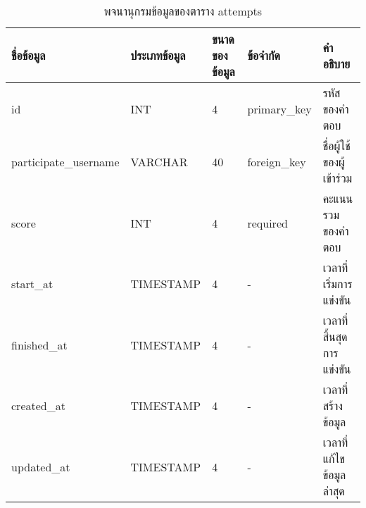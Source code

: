 \begin{table}[H]
    \caption{พจนานุกรมข้อมูลของตาราง attempts}
    \label{tab:database-attempts}
    \begin{tabularx}{\textwidth}{ | p{2.25cm} | p{2.20cm} | p{2.45cm} | p{2.05cm} | X | }
    \hline
    \textbf{ชื่อข้อมูล} & \textbf{ประเภทข้อมูล} & \textbf{ขนาดของข้อมูล} & \textbf{ข้อจำกัด} & \textbf{คำอธิบาย} \\
    \hline
    id & INT & 4 & primary\_key & รหัสของคำตอบ \\
    \hline
    participate\_username & VARCHAR & 40 & foreign\_key & ชื่อผู้ใช้ของผู้เข้าร่วม \\
    \hline
    score & INT & 4 & required & คะแนนรวมของคำตอบ \\
    \hline
    start\_at & TIMESTAMP & 4 & - & เวลาที่เริ่มการแข่งขัน \\
    \hline
    finished\_at & TIMESTAMP & 4 & - & เวลาที่สิ้นสุดการแข่งขัน \\
    \hline
    created\_at & TIMESTAMP & 4 & - & เวลาที่สร้างข้อมูล \\
    \hline
    updated\_at & TIMESTAMP & 4 & - & เวลาที่แก้ไขข้อมูลล่าสุด \\
    \hline
    \end{tabularx}
\end{table}